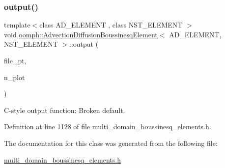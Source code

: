 \subsubsection{\texorpdfstring{output()}{output()}\hspace{0.1cm}{\footnotesize\ttfamily [4/4]}}
{\footnotesize\ttfamily template$<$class A\+D\+\_\+\+E\+L\+E\+M\+E\+NT , class N\+S\+T\+\_\+\+E\+L\+E\+M\+E\+NT $>$ \\
void \hyperlink{classoomph_1_1AdvectionDiffusionBoussinesqElement}{oomph\+::\+Advection\+Diffusion\+Boussinesq\+Element}$<$ A\+D\+\_\+\+E\+L\+E\+M\+E\+NT, N\+S\+T\+\_\+\+E\+L\+E\+M\+E\+NT $>$\+::output (\begin{DoxyParamCaption}\item[{F\+I\+LE $\ast$}]{file\+\_\+pt,  }\item[{const unsigned \&}]{n\+\_\+plot }\end{DoxyParamCaption})\hspace{0.3cm}{\ttfamily [inline]}}



C-\/style output function\+: Broken default. 



Definition at line 1128 of file multi\+\_\+domain\+\_\+boussinesq\+\_\+elements.\+h.



The documentation for this class was generated from the following file\+:\begin{DoxyCompactItemize}
\item 
\hyperlink{multi__domain__boussinesq__elements_8h}{multi\+\_\+domain\+\_\+boussinesq\+\_\+elements.\+h}\end{DoxyCompactItemize}
